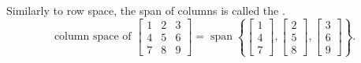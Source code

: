 \documentclass{ximera}
\begin{document}
\medskip

Similarly to row space, the span of columns is called the \emph{}.
\begin{equation*}
    \text{column space of }
    \begin{bmatrix}
        1 & 2 & 3 \\
        4 & 5 & 6 \\
        7 & 8 & 9
    \end{bmatrix}
    = \operatorname{span}
    \left\{
        \begin{bmatrix}
            1 \\ 
            4 \\ 
            7
        \end{bmatrix}
        ,
        \begin{bmatrix}
            2 \\ 
            5 \\ 
            8
        \end{bmatrix}
        ,
        \begin{bmatrix}
            3 \\ 
            6 \\ 
            9
        \end{bmatrix}
    \right\} .
\end{equation*}
\end{document}
